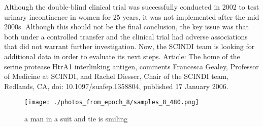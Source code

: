 \documentclass{article}%
\begin{document}
Although the double{-}blind clinical trial was successfully conducted in 2002 to test urinary incontinence in women for 25 years, it was not implemented after the mid 2000s.\newline%
Although this should not be the final conclusion, the key issue was that both under a controlled transfer and the clinical trial had adverse associations that did not warrant further investigation.\newline%
Now, the SCINDI team is looking for additional data in order to evaluate its next steps.\newline%
Article: The home of the serine protease HtrA1 interlinking antigen, comments Francesca Gealey, Professor of Medicine at SCINDI, and Rachel Diesser, Chair of the SCINDI team, Redlands, CA, doi: 10.1097/suafep.1358804, published 17 January 2006.\newline%

%


\begin{figure}[h!]%
\centering%
\texttt{[image: ./photos\_from\_epoch\_8/samples\_8\_480.png]}%
\caption{a man in a suit and tie is smiling}%
\end{figure}

%
\end{document}
